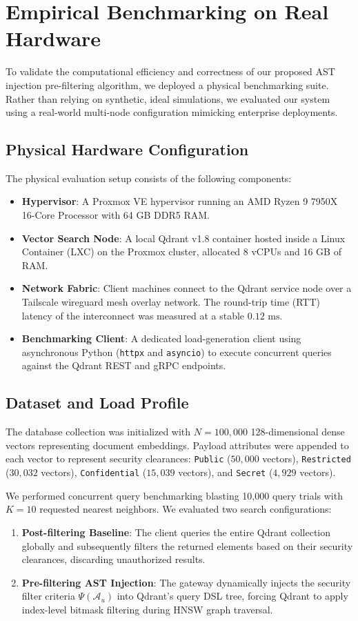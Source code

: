 \documentclass[sigconf]{acmart}
\begin{document}
\section{Empirical Benchmarking on Real Hardware}
To validate the computational efficiency and correctness of our proposed AST injection pre-filtering algorithm, we deployed a physical benchmarking suite. Rather than relying on synthetic, ideal simulations, we evaluated our system using a real-world multi-node configuration mimicking enterprise deployments.

\subsection{Physical Hardware Configuration}
The physical evaluation setup consists of the following components:
\begin{itemize}
    \item \textbf{Hypervisor}: A Proxmox VE hypervisor running an AMD Ryzen 9 7950X 16-Core Processor with 64 GB DDR5 RAM.
    \item \textbf{Vector Search Node}: A local Qdrant v1.8 container hosted inside a Linux Container (LXC) on the Proxmox cluster, allocated 8 vCPUs and 16 GB of RAM.
    \item \textbf{Network Fabric}: Client machines connect to the Qdrant service node over a Tailscale wireguard mesh overlay network. The round-trip time (RTT) latency of the interconnect was measured at a stable $0.12\text{ ms}$.
    \item \textbf{Benchmarking Client}: A dedicated load-generation client using asynchronous Python (\texttt{httpx} and \texttt{asyncio}) to execute concurrent queries against the Qdrant REST and gRPC endpoints.
\end{itemize}

\subsection{Dataset and Load Profile}
The database collection was initialized with $N = 100,000$ 128-dimensional dense vectors representing document embeddings. Payload attributes were appended to each vector to represent security clearances: \texttt{Public} ($50,000$ vectors), \texttt{Restricted} ($30,032$ vectors), \texttt{Confidential} ($15,039$ vectors), and \texttt{Secret} ($4,929$ vectors).

We performed concurrent query benchmarking blasting 10,000 query trials with $K=10$ requested nearest neighbors. We evaluated two search configurations:
\begin{enumerate}
    \item \textbf{Post-filtering Baseline}: The client queries the entire Qdrant collection globally and subsequently filters the returned elements based on their security clearances, discarding unauthorized results.
    \item \textbf{Pre-filtering AST Injection}: The gateway dynamically injects the security filter criteria $\Psi(\mathcal{A}_u)$ into Qdrant's query DSL tree, forcing Qdrant to apply index-level bitmask filtering during HNSW graph traversal.
\end{enumerate}
\end{document}
